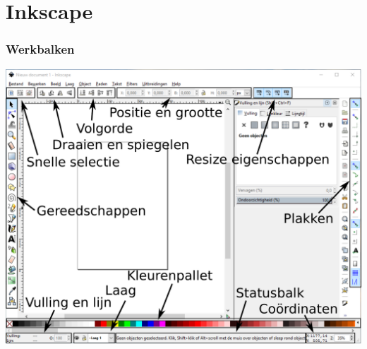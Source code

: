 \documentclass[t]{beamer}
\begin{document}
	\section{Inkscape}
	\begin{frame}
		\frametitle{Werkbalken}
		\begin{center}
			\includegraphics[height=0.85\textheight]{fig/inkscape_werkbalken}\\
		\end{center}	
	\end{frame}
\end{document}
